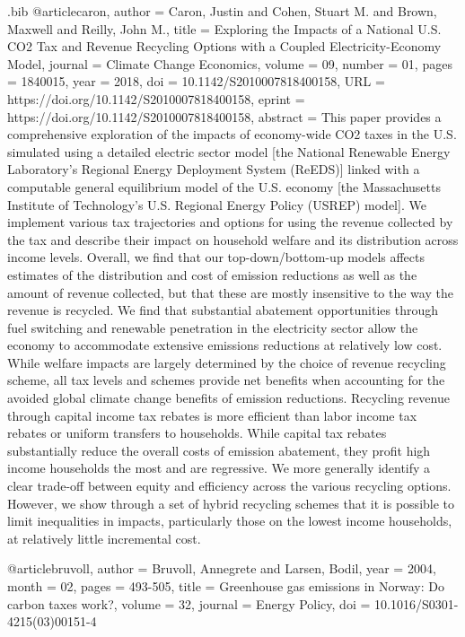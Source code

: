 \begin{filecontents}{.bib}
@article{caron,
    author = {Caron, Justin and Cohen, Stuart M. and Brown, Maxwell and Reilly, John M.},
    title = {Exploring the Impacts of a National U.S. CO2 Tax and Revenue Recycling Options with a Coupled Electricity-Economy Model},
    journal = {Climate Change Economics},
    volume = {09},
    number = {01},
    pages = {1840015},
    year = {2018},
    doi = {10.1142/S2010007818400158},
    URL = {https://doi.org/10.1142/S2010007818400158},
    eprint = {https://doi.org/10.1142/S2010007818400158},
    abstract = {This paper provides a comprehensive exploration of the impacts of economy-wide CO2 taxes in the U.S. simulated using a detailed electric sector model [the National Renewable Energy Laboratory’s Regional Energy Deployment System (ReEDS)] linked with a computable general equilibrium model of the U.S. economy [the Massachusetts Institute of Technology’s U.S. Regional Energy Policy (USREP) model]. We implement various tax trajectories and options for using the revenue collected by the tax and describe their impact on household welfare and its distribution across income levels. Overall, we find that our top-down/bottom-up models affects estimates of the distribution and cost of emission reductions as well as the amount of revenue collected, but that these are mostly insensitive to the way the revenue is recycled. We find that substantial abatement opportunities through fuel switching and renewable penetration in the electricity sector allow the economy to accommodate extensive emissions reductions at relatively low cost. While welfare impacts are largely determined by the choice of revenue recycling scheme, all tax levels and schemes provide net benefits when accounting for the avoided global climate change benefits of emission reductions. Recycling revenue through capital income tax rebates is more efficient than labor income tax rebates or uniform transfers to households. While capital tax rebates substantially reduce the overall costs of emission abatement, they profit high income households the most and are regressive. We more generally identify a clear trade-off between equity and efficiency across the various recycling options. However, we show through a set of hybrid recycling schemes that it is possible to limit inequalities in impacts, particularly those on the lowest income households, at relatively little incremental cost.}
}


@article{bruvoll,
  author = {Bruvoll, Annegrete and Larsen, Bodil},
  year = {2004},
  month = {02},
  pages = {493-505},
  title = {Greenhouse gas emissions in Norway: Do carbon taxes work?},
  volume = {32},
  journal = {Energy Policy},
  doi = {10.1016/S0301-4215(03)00151-4}
}



\end{filecontents}
